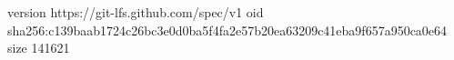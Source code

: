 version https://git-lfs.github.com/spec/v1
oid sha256:c139baab1724c26bc3e0d0ba5f4fa2e57b20ea63209c41eba9f657a950ca0e64
size 141621
